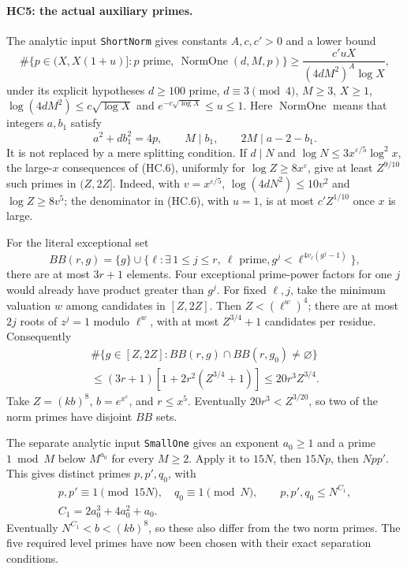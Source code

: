 \documentclass[11pt,a4paper]{article}
\numberwithin{equation}{section}
\theoremstyle{remark}\newtheorem{remark}[theorem]{Remark}
\begin{document}
\paragraph{HC5: the actual auxiliary primes.}
The analytic input \texttt{ShortNorm} gives constants $A,c,c'>0$
and a lower bound
\[
 \#\{p\in(X,X(1+u)]:p\text{ prime},\ \operatorname{NormOne}(d,M,p)\}
 \ge\frac{c'uX}{(4dM^2)^A\log X},                    \tag{HC.6}
\]
under its explicit hypotheses
$d\ge100$ prime, $d\equiv3\pmod4$, $M\ge3$, $X\ge1$,
$\log(4dM^2)\le c\sqrt{\log X}$ and
$e^{-c\sqrt{\log X}}\le u\le1$.
Here $\operatorname{NormOne}$ means that integers $a,b_1$ satisfy
\[
 a^2+db_1^2=4p,\qquad M\mid b_1,\qquad 2M\mid a-2-b_1.
                                                               \tag{HC.7}
\]
It is not replaced by a mere splitting condition.
If $d\mid N$ and $\log N\le3x^{\varepsilon/5}\log^2x$, the
large-$x$ consequences of (HC.6), uniformly for
$\log Z\ge8x^\varepsilon$, give at least $Z^{9/10}$ such
primes in $(Z,2Z]$. Indeed, with $v=x^{\varepsilon/5}$,
$\log(4dN^2)\le10v^2$ and $\log Z\ge8v^5$;
the denominator in (HC.6), with $u=1$, is at most
$c'Z^{1/10}$ once $x$ is large.

For the literal exceptional set
\[
 BB(r,g)=\{g\}\cup
 \{\ell:\exists\,1\le j\le r,\ \ell\text{ prime},
                      g^j<\ell^{4v_\ell(g^j-1)}\},
\]
there are at most $3r+1$ elements. Four exceptional prime-power
factors for one $j$ would already have product greater than $g^j$.
For fixed $\ell,j$, take the minimum valuation $w$ among candidates
in $[Z,2Z]$. Then $Z<(\ell^w)^4$; there are at most $2j$
roots of $z^j=1$ modulo $\ell^w$, with at most
$Z^{3/4}+1$ candidates per residue. Consequently
\[
 \begin{gathered}
 \#\{g\in[Z,2Z]:BB(r,g)\cap BB(r,g_0)\ne\varnothing\}
 \\
 \le(3r+1)[1+2r^2(Z^{3/4}+1)]\le20r^3Z^{3/4}.
 \end{gathered}                                      \tag{HC.8}
\]
Take $Z=(kb)^8$, $b=e^{x^\varepsilon}$, and $r\le x^5$.
Eventually $20r^3<Z^{3/20}$, so two of the norm primes have
disjoint $BB$ sets.

The separate analytic input \texttt{SmallOne} gives an exponent
$a_0\ge1$ and a prime $1\bmod M$ below $M^{a_0}$ for every
$M\ge2$. Apply it to $15N$, then $15Np$, then $Npp'$.
This gives distinct primes $p,p',q_0$, with
\[
 \begin{gathered}
 p,p'\equiv1\pmod{15N},\quad q_0\equiv1\pmod N,\qquad
 p,p',q_0\le N^{C_1},\\
 C_1=2a_0^3+4a_0^2+a_0.
 \end{gathered}                                      \tag{HC.9}
\]
Eventually $N^{C_1}<b<(kb)^8$, so these also differ from the
two norm primes. The five required level primes have now been
chosen with their exact separation conditions.
\end{document}
